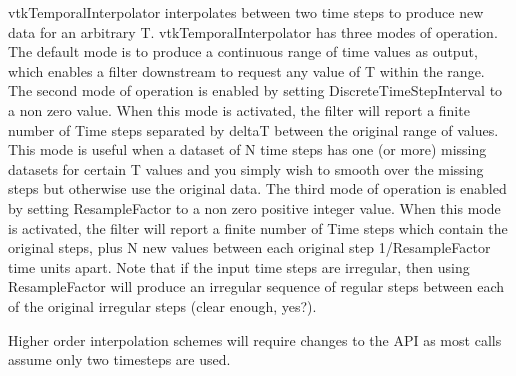 vtk\-Temporal\-Interpolator interpolates between two time steps to produce new data for an arbitrary T. vtk\-Temporal\-Interpolator has three modes of operation. The default mode is to produce a continuous range of time values as output, which enables a filter downstream to request any value of T within the range. The second mode of operation is enabled by setting Discrete\-Time\-Step\-Interval to a non zero value. When this mode is activated, the filter will report a finite number of Time steps separated by delta\-T between the original range of values. This mode is useful when a dataset of N time steps has one (or more) missing datasets for certain T values and you simply wish to smooth over the missing steps but otherwise use the original data. The third mode of operation is enabled by setting Resample\-Factor to a non zero positive integer value. When this mode is activated, the filter will report a finite number of Time steps which contain the original steps, plus N new values between each original step 1/\-Resample\-Factor time units apart. Note that if the input time steps are irregular, then using Resample\-Factor will produce an irregular sequence of regular steps between each of the original irregular steps (clear enough, yes?).

Higher order interpolation schemes will require changes to the A\-P\-I as most calls assume only two timesteps are used.

